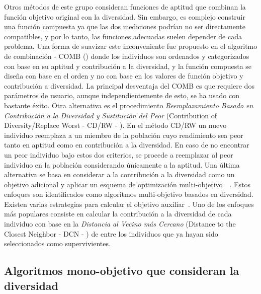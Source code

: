Otros métodos de este grupo consideran funciones de aptitud que combinan la función objetivo original con la diversidad.
%
Sin embargo, es complejo construir una función compuesta ya que las dos mediciones podrían no ser directamente compatibles,
y por lo tanto, las funciones adecuadas suelen depender de cada problema.
%
Una forma de suavizar este inconveniente fue propuesto en el algoritmo de combinación - COMB (\cite{vidal2013hybrid}) donde 
los individuos son ordenados y categorizados con base en su aptitud y contribución a la diversidad, y la función compuesta se 
diseña con base en el orden y no con base en los valores de función objetivo y contribución a diversidad.
%
La principal desventaja del COMB es que requiere dos parámetros de usuario, aunque independientemente de esto, se ha usado con
bastante éxito.
%
Otra alternativa es el procedimiento \textit{Reemplazamiento Basado en Contribución a la Diversidad y Sustitución del Peor} 
(Contribution of Diversity/Replace Worst - CD/RW - \cite{lozano2008replacement}).
%
En el método CD/RW un nuevo individuo reemplaza a un miembro de la población cuyo rendimiento sea peor tanto en aptitud como 
en contribución a la diversidad.
%
En caso de no encontrar un peor individuo bajo estos dos criterios, se procede a reemplazar al peor individuo en la población 
considerando únicamente a la aptitud.
%
Una última alternativa se basa en considerar a la contribución a la diversidad como un objetivo adicional y aplicar un esquema de 
optimización multi-objetivo~\cite{bui2005multiobjective}~\cite{mouret2011novelty}.
%
Estos enfoques son identificados como algoritmos multi-objetivo basados en diversidad.
%
Existen varias estrategias para calcular el objetivo auxiliar~\cite{segura2013using}.
%
Uno de los enfoques más populares consiste en calcular la contribución a la diversidad de cada individuo con base en 
la \textit{Distancia al Vecino más Cercano} (Distance to the Closest Neighbor - DCN - \cite{segura2016novel}) de entre los 
individuos que ya hayan sido seleccionados como supervivientes.

\subsection{Algoritmos mono-objetivo que consideran la diversidad}

